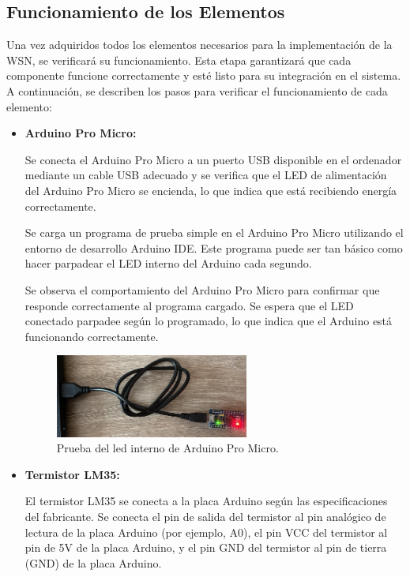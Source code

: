 \subsection{Funcionamiento de los Elementos}
Una vez adquiridos todos los elementos necesarios para la implementación de la WSN, se verificará su funcionamiento. Esta etapa garantizará que cada componente funcione correctamente y esté listo para su integración en el sistema. A continuación, se describen los pasos para verificar el funcionamiento de cada elemento:
\begin{itemize}
    \item \textbf{Arduino Pro Micro:}
    
Se conecta el Arduino Pro Micro a un puerto USB disponible en el ordenador mediante un cable USB adecuado y se verifica que el LED de alimentación del Arduino Pro Micro se encienda, lo que indica que está recibiendo energía correctamente.

Se carga un programa de prueba simple en el Arduino Pro Micro utilizando el entorno de desarrollo Arduino IDE. Este programa puede ser tan básico como hacer parpadear el LED interno del Arduino cada segundo.

Se observa el comportamiento del Arduino Pro Micro para confirmar que responde correctamente al programa cargado. Se espera que el LED conectado parpadee según lo programado, lo que indica que el Arduino está funcionando correctamente.
\begin{figure}[H]
    \centering
    \includegraphics[width=0.6\textwidth]{imagenes/prueba-led.jpeg}
    \caption{Prueba del led interno de Arduino Pro Micro.}
    \label{fig:prueba_led_arduino}
\end{figure}

\item \textbf{Termistor LM35:}

El termistor LM35 se conecta a la placa Arduino según las especificaciones del fabricante. Se conecta el pin de salida del termistor al pin analógico de lectura de la placa Arduino (por ejemplo, A0), el pin VCC del termistor al pin de 5V de la placa Arduino, y el pin GND del termistor al pin de tierra (GND) de la placa Arduino.


\end{itemize}
